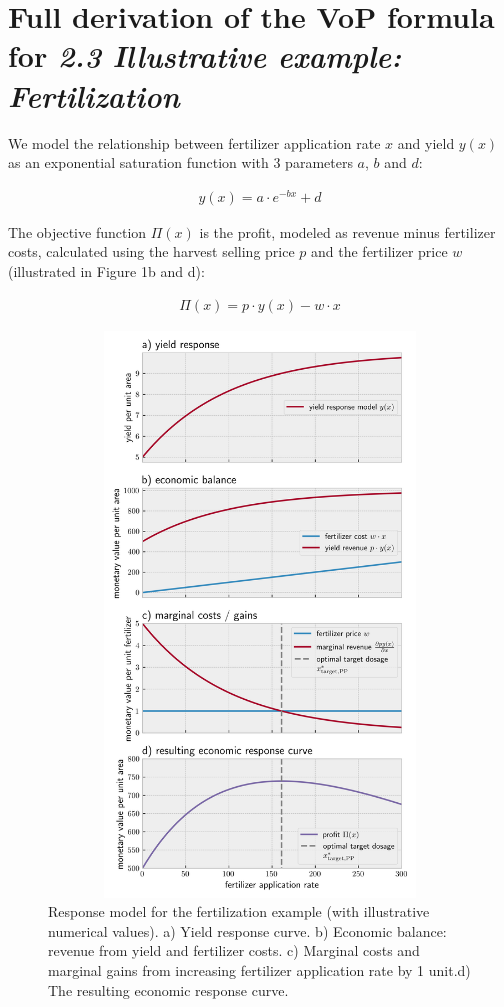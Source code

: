 \hypertarget{full-derivation-of-the-vop-formula-for-23-illustrative-example-fertilization}{%
\section*{\texorpdfstring{Full derivation of the VoP formula for \emph{2.3 Illustrative example: Fertilization}}{Full derivation of the VoP formula for 2.3 Illustrative example: Fertilization}}\label{full-derivation-of-the-vop-formula-for-23-illustrative-example-fertilization}}

We model the relationship between fertilizer application rate $x$ and yield $y(x)$ as an exponential saturation function with 3 parameters $a$, $b$ and $d$:

\begin{align}
y(x) = a \cdot e^{-b x} + d
\end{align}

The objective function $\Pi(x)$ is the profit, modeled as revenue minus fertilizer costs, calculated using the harvest selling price $p$ and the fertilizer price $w$ (illustrated in Figure 1b and d):

\begin{align}
\Pi(x) = p\cdot y(x) - w\cdot x
\end{align}

\begin{figure}
\centering
\includegraphics[width=15cm,height=15cm,keepaspectratio]{imgs/synplot1.png}
\caption{Response model for the fertilization example (with illustrative numerical values). a) Yield response curve. b) Economic balance: revenue from yield and fertilizer costs. c) Marginal costs and marginal gains from increasing fertilizer application rate by 1 unit.d) The resulting economic response curve.}
\end{figure}

